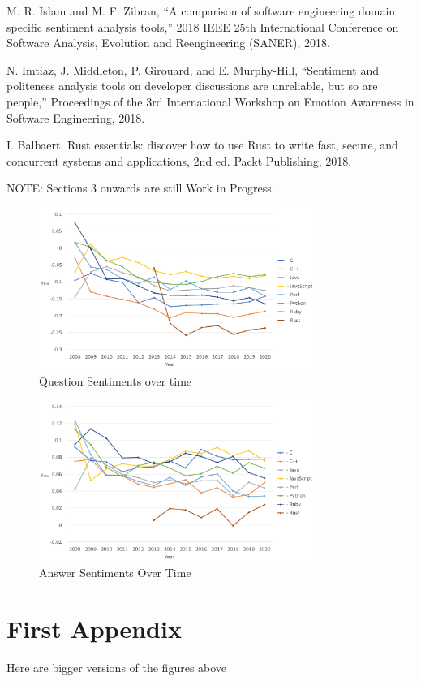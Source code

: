 \documentclass[conference]{IEEEtran}
\begin{document}
\begin{thebibliography}{00}
 M. R. Islam and M. F. Zibran, “A comparison of software engineering domain specific sentiment analysis tools,” 2018 IEEE 25th International Conference on Software Analysis, Evolution and Reengineering (SANER), 2018. 

 N. Imtiaz, J. Middleton, P. Girouard, and E. Murphy-Hill, “Sentiment and politeness analysis tools on developer discussions are unreliable, but so are people,” Proceedings of the 3rd International Workshop on Emotion Awareness in Software Engineering, 2018. 

 I. Balbaert, Rust essentials: discover how to use Rust to write fast, secure, and concurrent systems and applications, 2nd ed. Packt Publishing, 2018. 

\end{thebibliography}

\vspace{12pt}
\color{red}
NOTE: Sections 3 onwards are still Work in Progress.
\color{black}

\begin{figure}[htbp]
\centering
\includegraphics[width=0.8\textwidth]{figures/time_questions_em.png}
\caption{Question Sentiments over time}
\label{fig}
\end{figure}

\begin{figure}[htbp]
\centering
\includegraphics[width=0.8\textwidth]{figures/time_answers_em.png}
\caption{Answer Sentiments Over Time}
\label{fig}
\end{figure}

\appendices
\section{First Appendix}
Here are bigger versions of the figures above
\end{document}
